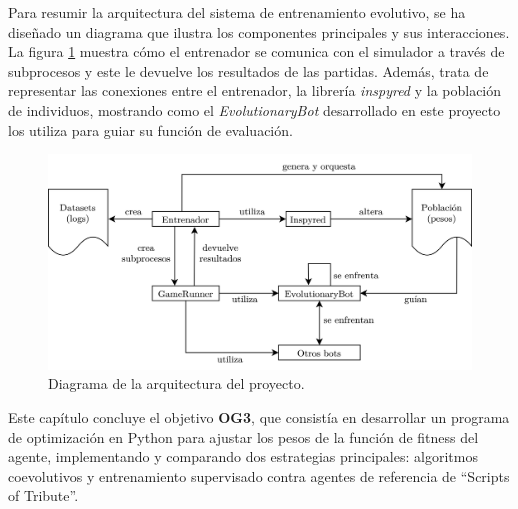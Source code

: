 Para resumir la arquitectura del sistema de entrenamiento evolutivo, se ha diseñado un diagrama que ilustra los componentes principales y sus interacciones. La figura \ref{fig:diagrama_arquitectura} muestra cómo el entrenador se comunica con el simulador a través de subprocesos y este le devuelve los resultados de las partidas. Además, trata de representar las conexiones entre el entrenador, la librería \textit{inspyred} y la población de individuos, mostrando como el \textit{EvolutionaryBot} desarrollado en este proyecto los utiliza para guiar su función de evaluación.

\begin{figure}[H]
	\centering
	\includegraphics[width=1.0\textwidth]{img/diagrama_arquitectura.png}
	\caption{Diagrama de la arquitectura del proyecto.}
	\label{fig:diagrama_arquitectura}
\end{figure}

Este capítulo concluye el objetivo \textbf{OG3}, que consistía en desarrollar un programa de optimización en Python para ajustar los pesos de la función de fitness del agente, implementando y comparando dos estrategias principales: algoritmos coevolutivos y entrenamiento supervisado contra agentes de referencia de ``Scripts of Tribute''.